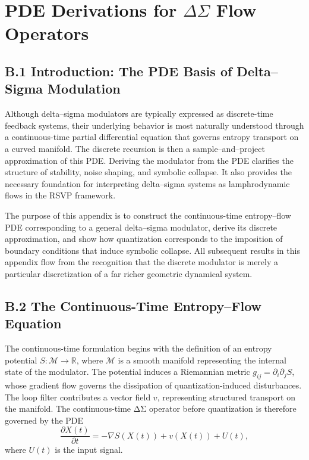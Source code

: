 \chapter{PDE Derivations for \texorpdfstring{$\Delta\Sigma$}{} Flow Operators}

\section{B.1 Introduction: The PDE Basis of Delta–Sigma Modulation}

Although delta–sigma modulators are typically expressed as discrete-time feedback systems, their underlying behavior is most naturally understood through a continuous-time partial differential equation that governs entropy transport on a curved manifold. The discrete recursion is then a sample–and–project approximation of this PDE. Deriving the modulator from the PDE clarifies the structure of stability, noise shaping, and symbolic collapse. It also provides the necessary foundation for interpreting delta–sigma systems as lamphrodynamic flows in the RSVP framework.

The purpose of this appendix is to construct the continuous-time entropy–flow PDE corresponding to a general delta–sigma modulator, derive its discrete approximation, and show how quantization corresponds to the imposition of boundary conditions that induce symbolic collapse. All subsequent results in this appendix flow from the recognition that the discrete modulator is merely a particular discretization of a far richer geometric dynamical system.

\section{B.2 The Continuous-Time Entropy–Flow Equation}

The continuous-time formulation begins with the definition of an entropy potential \(S : \mathcal{M} \to \mathbb{R}\), where \(\mathcal{M}\) is a smooth manifold representing the internal state of the modulator. The potential induces a Riemannian metric \(g_{ij} = \partial_i \partial_j S\), whose gradient flow governs the dissipation of quantization-induced disturbances. The loop filter contributes a vector field \(v\), representing structured transport on the manifold. The continuous-time ΔΣ operator before quantization is therefore governed by the PDE
\[
\frac{\partial X(t)}{\partial t} = -\nabla S(X(t)) + v(X(t)) + U(t),
\]
where \(U(t)\) is the input signal.


